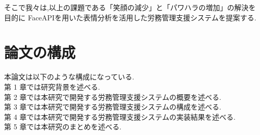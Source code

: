 そこで我々は,以上の課題である「笑顔の減少」と「パワハラの増加」の解決を目的に
FaceAPIを用いた表情分析を活用した労務管理支援システムを提案する.

\section{論文の構成}
\label{sec:tex_basic_newline}
本論文は以下のような構成になっている.
\\
第 1 章では研究背景を述べる.
\\
第 2 章では本研究で開発する労務管理支援システムの概要を述べる.
\\
第 3 章では本研究で開発する労務管理支援システムの構成を述べる.
\\
第 4 章では本研究で開発する労務管理支援システムの実装結果を述べる.
\\
第 5 章では本研究のまとめを述べる.
